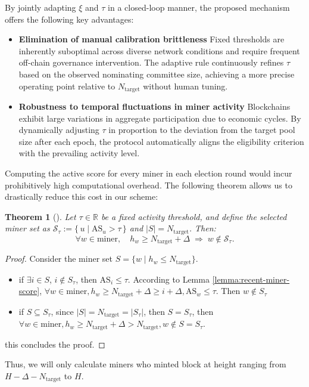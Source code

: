 \documentclass[journal]{IEEEtran}
\newtheorem{theorem}{Theorem}
\begin{document}
By jointly adapting $\xi$ and $ \tau $ in a closed-loop manner, the proposed mechanism offers the following key advantages:
\begin{itemize}
    \item \textbf{Elimination of manual calibration brittleness} Fixed thresholds are inherently suboptimal across diverse network conditions and require frequent off-chain governance intervention. The adaptive rule continuously refines $  \tau  $ based on the observed nominating committee size, achieving a more precise operating point relative to $N_{\text{target}}$ without human tuning.
    \item \textbf{Robustness to temporal fluctuations in miner activity} Blockchains exhibit large variations in aggregate participation due to economic cycles. By dynamically adjusting $  \tau  $ in proportion to the deviation from the target pool size after each epoch, the protocol automatically aligns the eligibility criterion with the prevailing activity level.
\end{itemize}

Computing the active score for every miner in each election round would incur prohibitively high computational overhead. The following theorem allows us to drastically reduce this cost in our scheme:
\begin{theorem}[]
\label{thm:threshold_selection}
Let \( \tau \in \mathbb{R} \) be a fixed activity threshold, and define the selected miner set as $\mathcal{S}_\tau := \{\, u \mid \mathrm{AS}_u > \tau \,\}$ and $|S|=N_{\text{target}}$. Then:$$\forall w \in \text{miner},\quad h_w \ge N_{\text{target}} + \Delta \;\Rightarrow\; w \notin \mathcal{S}_\tau.$$
\end{theorem}
\begin{proof}
Consider the miner set $S=\{w \mid h_w \le N_{\text{target}}\}$.
\begin{itemize}
    \item if $\exists i \in S$, $i \notin S_\tau$, then $\text{AS}_i \le \tau$. According to Lemma \ref{lemma:recent-miner-score}, $\forall w \in \text{miner}, h_w \ge N_{\text{target}}+\Delta\ge i+\Delta, \text{AS}_w \le \tau$. Then $w \notin S_\tau$
    \item  if $S \subseteq S_\tau$, since $|S|=N_{\text{target}}=|S_\tau|$, then $S=S_\tau$, then $\forall w \in \text{miner}, h_w \ge N_{\text{target}}+\Delta>N_{\text{target}}, w \notin S=S_\tau$.
\end{itemize}
this concludes the proof.
\end{proof}
Thus, we will only calculate miners who minted block at height ranging from $H-\Delta-N_{\text{target}}$ to $H$.
\end{document}
